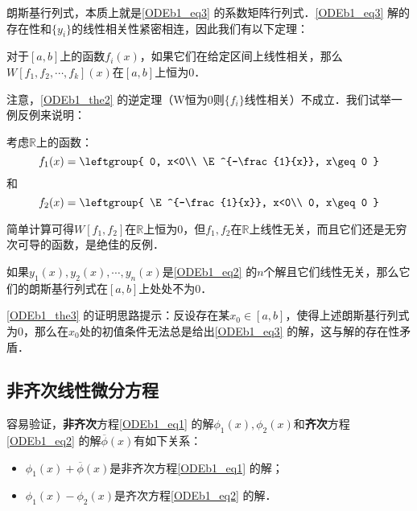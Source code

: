 朗斯基行列式，本质上就是\autoref{ODEb1_eq3} 的系数矩阵行列式．\autoref{ODEb1_eq3} 解的存在性和$\{y_i\}$的线性相关性紧密相连，因此我们有以下定理：




\begin{theorem}{}\label{ODEb1_the2}
对于$[a, b]$上的函数$f_i(x)$，如果它们在给定区间上线性相关，那么$W[f_1, f_2, \cdots, f_k](x)$在$[a, b]$上恒为$0$．
\end{theorem}

注意，\autoref{ODEb1_the2} 的逆定理（W恒为$0$则$\{f_i\}$线性相关）不成立．我们试举一例反例来说明：

\begin{example}{}
考虑$\mathbb{R}$上的函数：
\begin{equation}
f_1(x)=\leftgroup{
    0, x<0\\
    \E^{-\frac{1}{x}}, x\geq 0
}
\end{equation}
和
\begin{equation}
f_2(x)=\leftgroup{
    \E^{-\frac{1}{x}}, x<0\\
    0, x\geq 0
}
\end{equation}

简单计算可得$W[f_1, f_2]$在$\mathbb{R}$上恒为$0$，但$f_1, f_2$在$\mathbb{R}$上线性无关，而且它们还是无穷次可导的函数，是绝佳的反例．




\end{example}

\begin{theorem}{}\label{ODEb1_the3}
如果$y_1(x), y_2(x), \cdots, y_n(x)$是\autoref{ODEb1_eq2} 的$n$个解且它们线性无关，那么它们的朗斯基行列式在$[a, b]$上处处不为$0$．
\end{theorem}

\autoref{ODEb1_the3} 的证明思路提示：反设存在某$x_0\in[a, b]$，使得上述朗斯基行列式为$0$，那么在$x_0$处的初值条件无法总是给出\autoref{ODEb1_eq3} 的解，这与解的存在性矛盾．




\subsection{非齐次线性微分方程}

容易验证，\textbf{非齐次}方程\autoref{ODEb1_eq1} 的解${\phi}_1(x), \phi_2(x)$和\textbf{齐次}方程\autoref{ODEb1_eq2} 的解$\overline{\phi}(x)$有如下关系：
\begin{itemize}
\item $\phi_1(x)+\overline{\phi}(x)$是非齐次方程\autoref{ODEb1_eq1} 的解；
\item $\phi_1(x)-\phi_2(x)$是齐次方程\autoref{ODEb1_eq2} 的解．
\end{itemize}

